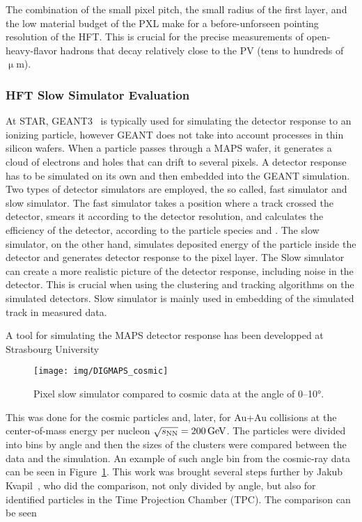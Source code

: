 The combination of the small pixel pitch, the small radius of the first layer, and the low material budget of the PXL make for a before-unforseen pointing resolution of the HFT\@. This is crucial for the precise measurements of open-heavy-flavor hadrons that decay relatively close to the PV (tens to hundreds of $\upmu$m)\@.  

\subsubsection{HFT Slow Simulator Evaluation}

At STAR, GEANT3~\cite{GEANT} is typically used for simulating the detector response to an ionizing particle, however GEANT does not take into account processes in thin silicon wafers. When a particle passes through a MAPS wafer, it generates a cloud of electrons and holes that can drift to several pixels. A detector response has to be simulated on its own and then embedded into the GEANT simulation. Two types of detector simulators are employed, the so called, fast simulator and slow simulator. The fast simulator takes a position where a track crossed the detector, smears it according to the detector resolution, and calculates the efficiency of the detector, according to the particle species and \pt\@. The slow simulator, on the other hand, simulates deposited energy of the particle inside the detector and generates detector response to the pixel layer. The Slow simulator can create a more realistic picture of the detector response, including noise in the detector. This is crucial when using the clustering and tracking algorithms on the simulated detectors. Slow simulator is mainly used in embedding of the simulated track in measured data.

A tool for simulating the MAPS detector response has been developped at Strasbourg University~\cite{DIGMAPS}

\begin{figure}[!htb]
\begin{center}
 \texttt{[image: img/DIGMAPS\_cosmic]}\\
\end{center}
\caption{\label{cosmicDigmaps}Pixel slow simulator compared to cosmic data at the angle of 0--10°.}
\end{figure}

This was done for the cosmic particles and, later, for Au+Au collisions at the center-of-mass energy per nucleon $\sqrt{s_\text{NN}} = \SI{200}{\giga\electronvolt}$\@. The particles were divided into bins by angle and then the sizes of the clusters were compared between the data and the simulation. An example of such angle bin from the cosmic-ray data can be seen in Figure~\ref{cosmicDigmaps}.
This work was brought several steps further by Jakub Kvapil~\cite{KubaVyzkumak}, who did the comparison, not only divided by angle, but also for identified particles in the Time Projection Chamber (TPC). The comparison can be seen 

